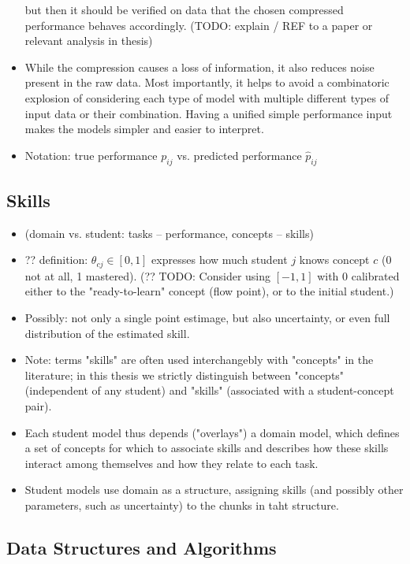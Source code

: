 \begin{itemize}
  but then it should be verified on data that the chosen compressed performance
  behaves accordingly. (TODO: explain / REF to a paper or relevant analysis in
  thesis)
\item While the compression causes a loss of information,
  it also reduces noise present in the raw data.
  Most importantly, it helps to avoid a combinatoric explosion of
  considering each type of model with multiple different types of input data or
  their combination.
  Having a unified simple performance input makes the models simpler and
  easier to interpret.
\item Notation: true performance $p_{ij}$ vs. predicted performance $\hat{p}_{ij}$
\end{itemize}


\subsection{Skills}

\begin{itemize}
\item (domain vs. student: tasks -- performance, concepts -- skills)
\item ?? definition:
  $\theta_{cj} \in [0, 1]$ expresses how much student $j$ knows concept $c$
  (0 not at all, 1 mastered).
  (?? TODO: Consider using $[-1, 1]$ with 0 calibrated either to the "ready-to-learn"
  concept (flow point), or to the initial student.)
\item Possibly: not only a single point estimage, but also uncertainty,
  or even full distribution of the estimated skill.
\item Note: terms "skills" are often used interchangebly with "concepts" in
  the literature; in this thesis we strictly distinguish between "concepts"
  (independent of any student) and "skills" (associated with a student-concept
  pair).
\item Each student model thus depends ("overlays") a domain model, which
  defines a set of concepts for which to associate skills
  and describes how these skills interact among themselves and how they
  relate to each task.
\item Student models use domain as a structure,
  assigning skills (and possibly other parameters, such as uncertainty)
  to the chunks in taht structure.
\end{itemize}


\subsection{Data Structures and Algorithms}

